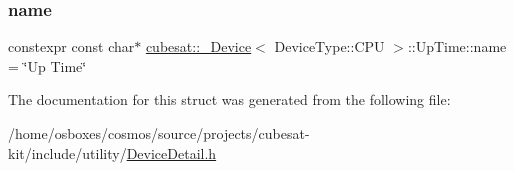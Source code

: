 \subsubsection{\texorpdfstring{name}{name}}
{\footnotesize\ttfamily constexpr const char$\ast$ \hyperlink{structcubesat_1_1__Device}{cubesat\+::\+\_\+\+Device}$<$ Device\+Type\+::\+C\+PU $>$\+::Up\+Time\+::name = \char`\"{}Up Time\char`\"{}\hspace{0.3cm}{\ttfamily [static]}}



The documentation for this struct was generated from the following file\+:\begin{DoxyCompactItemize}
\item 
/home/osboxes/cosmos/source/projects/cubesat-\/kit/include/utility/\hyperlink{DeviceDetail_8h}{Device\+Detail.\+h}\end{DoxyCompactItemize}
